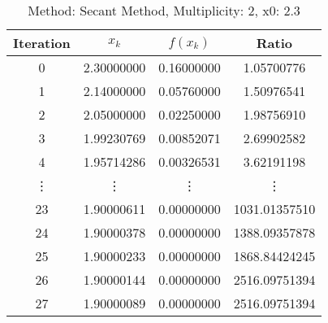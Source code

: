 \begin{table}
\centering
\caption{Method: Secant Method, Multiplicity: 2, x0: 2.3}
\label{tab:table_Secant_Method_2_2_3}
\begin{tabular}{c c c c}
\toprule
Iteration &      $x_k$ &   $f(x_k)$ &         Ratio \\
\midrule
        0 & 2.30000000 & 0.16000000 &    1.05700776 \\
        1 & 2.14000000 & 0.05760000 &    1.50976541 \\
        2 & 2.05000000 & 0.02250000 &    1.98756910 \\
        3 & 1.99230769 & 0.00852071 &    2.69902582 \\
        4 & 1.95714286 & 0.00326531 &    3.62191198 \\
   \vdots &     \vdots &     \vdots &        \vdots \\
       23 & 1.90000611 & 0.00000000 & 1031.01357510 \\
       24 & 1.90000378 & 0.00000000 & 1388.09357878 \\
       25 & 1.90000233 & 0.00000000 & 1868.84424245 \\
       26 & 1.90000144 & 0.00000000 & 2516.09751394 \\
       27 & 1.90000089 & 0.00000000 & 2516.09751394 \\
\bottomrule
\end{tabular}
\end{table}
